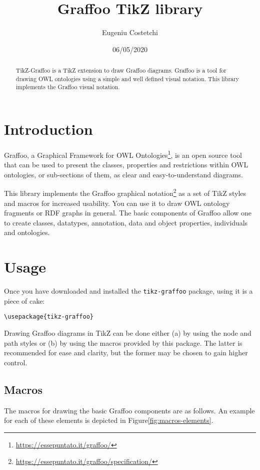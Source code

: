\documentclass[11pt,a4paper,final,oneside,onecolumn]{article}
\author{Eugeniu Costetchi}
\title{Graffoo TikZ library}
\date{06/05/2020}
\begin{document}
	\maketitle
	
	\tableofcontents
	
	\begin{abstract}
		TikZ-Graffoo is a TikZ extension to draw Graffoo diagrams. Graffoo is a tool for drawing OWL ontologies using a simple and well defined visual notation. This library implements the Graffoo visual notation. 
	\end{abstract}
	
	\section{Introduction}
	
	Graffoo, a Graphical Framework for OWL Ontologies\footnote{\url{https://essepuntato.it/graffoo/}}, is an open source tool that can be used to present the classes, properties and restrictions within OWL ontologies, or sub-sections of them, as clear and easy-to-understand diagrams.
	
	This library implements the Graffoo graphical notation\footnote{\url{https://essepuntato.it/graffoo/specification/}} as a set of TikZ styles and macros for increased usability. You can use it to draw OWL ontology fragments or RDF graphs in general. The basic components of Graffoo allow one to create classes, datatypes, annotation, data and object properties, individuals and ontologies.
	
	\section{Usage}
	Once you have downloaded and installed the \texttt{tikz-graffoo} package, using
	it is a piece of cake:
	
	\verb|\usepackage{tikz-graffoo}|
	
	Drawing Graffoo diagrams in TikZ can be done either (a) by using the node and path styles or (b) by using the macros provided by this package. The latter is recommended for ease and clarity, but the former may be chosen to gain higher control. 
	
	
	\subsection{Macros}
	
	The macros for drawing the basic Graffoo components are as follows. An example for each of these elements is depicted in Figure\ref{fig:macros-elements}.
	
\end{document}
